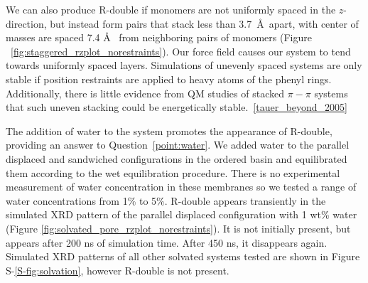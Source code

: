 \documentclass[journal=jpcbfk,manuscript=article]{achemso}
\begin{document}
  We can also produce R-double if monomers are not uniformly spaced in the
  $z$-direction, but instead form pairs that stack less than 3.7~\AA~apart, with
  center of masses are spaced 7.4 \AA~ from neighboring pairs of monomers (Figure
  ~\ref{fig:staggered_rzplot_norestraints}). 
  Our force field causes our system to tend towards uniformly spaced layers.
  Simulations of unevenly spaced systems are only stable if position restraints
  are applied to heavy atoms of the phenyl rings.  Additionally, there is little
  evidence from QM studies of stacked $\pi-\pi$ systems that such uneven stacking
  could be energetically stable.~\ref{tauer_beyond_2005} 
  
  The addition of water to the system promotes the appearance of R-double, providing
  an answer to Question~\ref{point:water}.
  We added water to the parallel displaced and sandwiched configurations in the
  ordered basin and equilibrated them according to the wet equilibration
  procedure. There is no experimental measurement of water concentration in these
  membranes so we tested a range of water concentrations from 1\% to 5\%.
  R-double appears transiently in the simulated XRD pattern of the parallel
  displaced configuration with 1 wt\% water (Figure
  \ref{fig:solvated_pore_rzplot_norestraints}). It is not initially present, but
  appears after 200 ns of simulation time. After 450 ns, it disappears again.
  Simulated XRD patterns of all other solvated systems tested are shown in Figure
  S-\ref{S-fig:solvation}, however R-double is not present.
\end{document}
